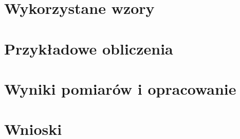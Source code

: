\documentclass[12pt, a4paper, oneside]{article}
\begin{document}
\section{Wykorzystane wzory}

\section{Przykładowe obliczenia}


\section{Wyniki pomiarów i opracowanie}

\section{Wnioski}
\end{document}
